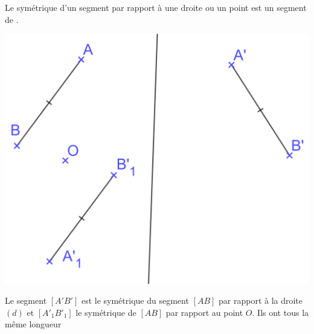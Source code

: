 \documentclass[xcolor={dvipsnames}]{beamer}
\begin{document}
\begin{frame}
	\begin{myprop}
		Le symétrique d'un segment par rapport à une droite ou un point est un segment de . 
	\end{myprop}
	
	\begin{myex}
		\begin{center}
			\includegraphics[scale=0.1]{sym_seg}
		\end{center}
		
		Le segment $[A'B']$ est le symétrique du segment $[AB]$ par rapport à la droite $(d)$ et $[A'_1B'_1]$ le symétrique de $[AB]$ par rapport au point $O$. \pause
		Ils ont tous la même longueur
		
		
	\end{myex}
\end{frame}
\end{document}
